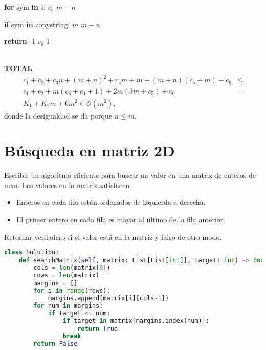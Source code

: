 \documentclass{article}
\newcommand{\bigO}{\mathcal{O}} %
\begin{document}
\begin{algorithm}
\begin{algorithmic}
            \item \hspace{1.3cm} \textbf{for} sym \textbf{in} s: \hspace{5.65cm} $c_5$ \hspace{0.7cm} $m-n$
                \item \hspace{1.6cm} \textbf{if} sym \textbf{in} copystring: \hspace{4.1cm} $m$ \hspace{0.7cm} $m-n$
                    \item \hspace{1.9cm} \textbf{return} -1 \hspace{5.5cm} $c_6$ \hspace{1.1cm} 1 \\
\end{algorithmic}
\end{algorithm} \\

\textbf{TOTAL} 
\begin{align*}
    c_1+c_2+c_3n+(m+n)^2+c_4m+m+(m+n)(c_5+m)+c_6 &\leq \\
    c_1+c_2+m(c_3+c_4+1)+2m(3m+c_5)+c_6 &= \\
    K_1 + K_2m + 6m^2 \in \bigO(m^2),
\end{align*}
donde la desigualdad se da porque $n \leq m$.
\newpage
\section*{Búsqueda en matriz 2D}
Escribir un algoritmo eficiente para buscar un valor en una matriz de enteros de mxn. Los valores en la matriz satisfacen 
\begin{itemize}
    \item Enteros en cada fila están ordenados de izquierda a derecha.
    \item El primer entero en cada fila es mayor al último de la fila anterior.
\end{itemize}
Retornar verdadero si el valor está en la matriz y falso de otro modo.

\begin{lstlisting}[language=Python]
class Solution:
    def searchMatrix(self, matrix: List[List[int]], target: int) -> bool:
        cols = len(matrix[0])
        rows = len(matrix)
        margins = []
        for i in range(rows):
            margins.append(matrix[i][cols-1])
        for num in margins:
            if target <= num:
                if target in matrix[margins.index(num)]:
                    return True
                break
        return False
\end{lstlisting}
\vspace{0.5cm}
\end{document}
